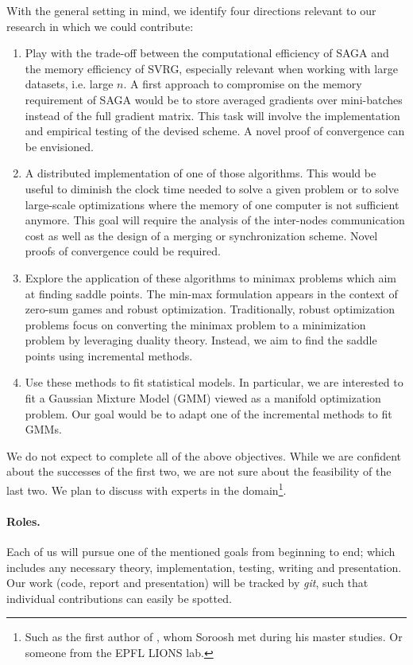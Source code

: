 \documentclass[a4paper,11pt]{article}
\begin{document}
With the general setting in mind, we identify four directions relevant to our
research in which we could contribute:
\begin{enumerate}
	\setlength{\itemsep}{0pt} \setlength{\parskip}{0pt}
	\item Play with the trade-off between the computational efficiency of SAGA
		and the memory efficiency of SVRG, especially relevant when working with
		large datasets, i.e. large $n$. A first approach to compromise on the
		memory requirement of SAGA would be to store averaged gradients over
		mini-batches instead of the full gradient matrix. This task will involve
		the implementation and empirical testing of the devised scheme. A novel
		proof of convergence can be envisioned.
	\item A distributed implementation of one of those algorithms. This would be
		useful to diminish the clock time needed to solve a given problem or to
		solve large-scale optimizations where the memory of one computer is not
		sufficient anymore. This goal will require the analysis of the
		inter-nodes communication cost as well as the design of a merging or
		synchronization scheme. Novel proofs of convergence could be required.
	\item Explore the application of these algorithms to minimax problems which
		aim at finding saddle points. The min-max formulation appears in the
		context of zero-sum games and robust optimization. Traditionally, robust
		optimization problems focus on converting the minimax problem to a
		minimization problem by leveraging duality theory. Instead, we aim to
		find the saddle points using incremental methods.
	\item Use these methods to fit statistical models. In particular, we are
		interested to fit a Gaussian Mixture Model (GMM) viewed as a manifold
		optimization problem. Our goal would be to adapt one of the incremental
		methods to fit GMMs.
\end{enumerate}
We do not expect to complete all of the above objectives. While we are confident
about the successes of the first two, we are not sure about the feasibility of
the last two. We plan to discuss with experts in the domain\footnote{Such as the
first author of \cite{reshad_matrix_2015}, whom Soroosh met during his master
studies. Or someone from the EPFL LIONS lab.}.

\paragraph{Roles.}
Each of us will pursue one of the mentioned goals from beginning to end; which
includes any necessary theory, implementation, testing, writing and
presentation. Our work (code, report and presentation) will be tracked by
\textit{git}, such that individual contributions can easily be spotted.
\end{document}
